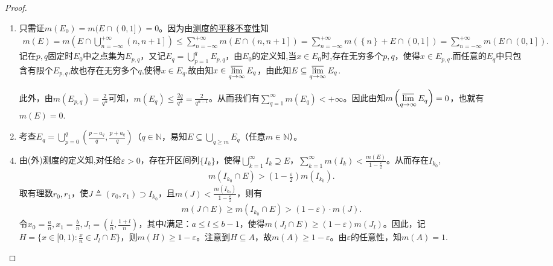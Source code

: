 \documentclass[../../main.tex]{subfiles}%
\begin{document}
\begin{proof}
\begin{enumerate}[(1)]
\item 只需证$m(E_0)=m(E\cap(0,1])=0$。因为由\hyperref[theorem:外测度的平移不变性]{测度的平移不变性}知
\begin{align*}
m\left( E \right) =m\left( E\cap \bigcup_{n=-\infty}^{+\infty}{\left( n,n+1 \right]} \right) \leqslant \sum_{n=-\infty}^{+\infty}{m\left( E\cap \left( n,n+1 \right] \right)}=\sum_{n=-\infty}^{+\infty}{m\left( \left\{ n \right\} +E\cap \left( 0,1 \right] \right)}=\sum_{n=-\infty}^{+\infty}{m\left( E\cap \left( 0,1 \right] \right)}.
\end{align*}
记在$p,q$固定时$E_0$中之点集为$E_{p,q}$，又记$E_q=\bigcup\limits_{p=1}^{q}E_{p,q}$，由$E_0$的定义知,当$x\in E_0$时,存在无穷多个$p,q$，使得$x\in E_{p,q}$.而任意的$E_q$中只包含有限个$E_{p,q}$,故也存在无穷多个$q$,使得$x\in E_q$.故由知$x\in\varlimsup\limits_{q\to\infty}E_q$，由此知$E\subseteq\varlimsup\limits_{q\to\infty}E_q$.

此外，由$m(E_{p,q})=\frac{2}{q^{\alpha}}$可知，$m(E_q)\leqslant \frac{2q}{q^\alpha}=\frac{2}{q^{\alpha-1}}$。从而我们有$\sum\limits_{q=1}^{\infty}m(E_q)<+\infty$。因此由知$m\left(\varlimsup\limits_{q\to\infty}E_q\right)=0$，也就有$m(E)=0$.

\item 考查$E_q=\bigcup\limits_{p=0}^{q}(\frac{p-a_q}{q},\frac{p+a_q}{q})$（$q\in\mathbb{N}$，易知$E\subseteq\bigcup\limits_{q\geqslant m}E_q$（任意$m\in\mathbb{N}$）。
\end{enumerate}
\begin{enumerate}[(1)]
\setcounter{enumi}{3}
\item 由(外)测度的定义知,对任给$\varepsilon>0$，存在开区间列$\{I_k\}$，使得$\bigcup\limits_{k=1}^{\infty}I_k\supseteq E$，$\sum\limits_{k=1}^{\infty}m(I_k)<\frac{m\left( E \right)}{1-\frac{\varepsilon}{2}}$。从而存在$I_{k_0}$,
\begin{align*}
m(I_{k_0}\cap E)>(1-\frac{\varepsilon}{2})m(I_{k_0}).
\end{align*}
取有理数$r_0,r_1$，使$J\triangleq(r_0,r_1)\supset I_{k_0}$，且$m(J)<\frac{m\left( I_{k_0} \right)}{1-\frac{\varepsilon}{2}}$，则有
\begin{align*}
m(J\cap E)\geqslant m(I_{k_0}\cap E)>(1-\varepsilon)\cdot m(J).
\end{align*}
令$x_0=\frac{a}{n},x_1=\frac{b}{n},J_l=(\frac{l}{n},\frac{1+l}{n})$，其中$l$满足：$a\leqslant l\leqslant b-1$，使得$m(J_l\cap E)\geqslant(1-\varepsilon)m(J_l)$。因此，记$H=\{x\in[0,1):\frac{x}{n}\in J_l\cap E\}$，则$m(H)\geqslant1-\varepsilon$。注意到$H\subseteq A$，故$m(A)\geqslant1-\varepsilon$。由$\varepsilon$的任意性，知$m(A)=1$.
\end{enumerate}
\end{proof}
\end{document}
